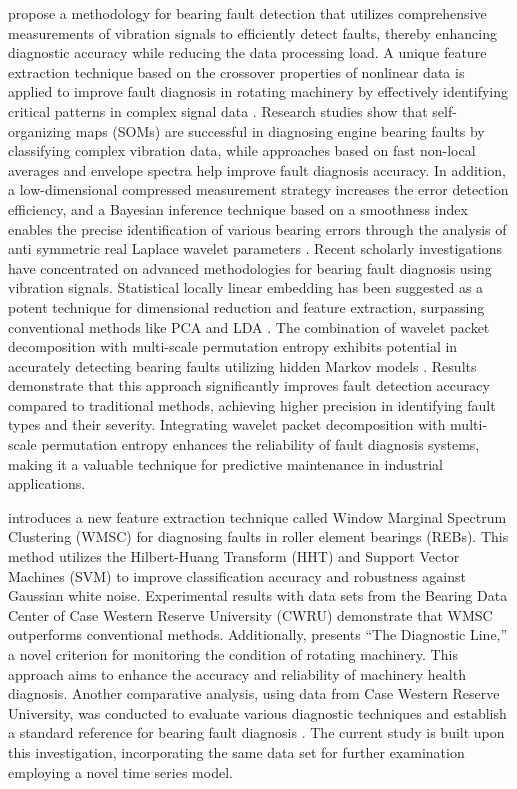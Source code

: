\documentclass[sn-basic,pdflatex]{sn-jnl}
\theoremstyle{remark}
\theoremstyle{definition}
\begin{document}
\citet{WOS:000335959500009} propose a methodology for bearing fault
detection that utilizes comprehensive measurements of vibration signals
to efficiently detect faults, thereby enhancing diagnostic accuracy
while reducing the data processing load. A unique feature extraction
technique based on the crossover properties of nonlinear data is applied
to improve fault diagnosis in rotating machinery by effectively
identifying critical patterns in complex signal data
\citep{WOS:000338603900013}. Research studies show that self-organizing
maps (SOMs) are successful in diagnosing engine bearing faults by
classifying complex vibration data, while approaches based on fast
non-local averages and envelope spectra help improve fault diagnosis
accuracy. In addition, a low-dimensional compressed measurement strategy
increases the error detection efficiency, and a Bayesian inference
technique based on a smoothness index enables the precise identification
of various bearing errors through the analysis of anti symmetric real
Laplace wavelet parameters
\citep{WOS:000380543400119, WOS:000348309400067, WOS:000354607100016, WOS:000350998800016}.
Recent scholarly investigations have concentrated on advanced
methodologies for bearing fault diagnosis using vibration signals.
Statistical locally linear embedding has been suggested as a potent
technique for dimensional reduction and feature extraction, surpassing
conventional methods like PCA and LDA \citep{WOS:000361788200068}. The
combination of wavelet packet decomposition with multi-scale permutation
entropy exhibits potential in accurately detecting bearing faults
utilizing hidden Markov models \citep{WOS:000362513400031}. Results
demonstrate that this approach significantly improves fault detection
accuracy compared to traditional methods, achieving higher precision in
identifying fault types and their severity. Integrating wavelet packet
decomposition with multi-scale permutation entropy enhances the
reliability of fault diagnosis systems, making it a valuable technique
for predictive maintenance in industrial applications.

\citet{WOS:000365686400021} introduces a new feature extraction
technique called Window Marginal Spectrum Clustering (WMSC) for
diagnosing faults in roller element bearings (REBs). This method
utilizes the Hilbert-Huang Transform (HHT) and Support Vector Machines
(SVM) to improve classification accuracy and robustness against Gaussian
white noise. Experimental results with data sets from the Bearing Data
Center of Case Western Reserve University (CWRU) demonstrate that WMSC
outperforms conventional methods. Additionally,
\citet{WOS:000366534900022} presents ``The Diagnostic Line,'' a novel
criterion for monitoring the condition of rotating machinery. This
approach aims to enhance the accuracy and reliability of machinery
health diagnosis. Another comparative analysis, using data from Case
Western Reserve University, was conducted to evaluate various diagnostic
techniques and establish a standard reference for bearing fault
diagnosis \citep{WOS:000357230900007}. The current study is built upon
this investigation, incorporating the same data set for further
examination employing a novel time series model.
\end{document}
